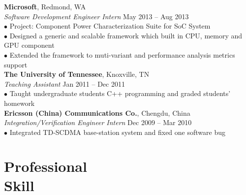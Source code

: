 \documentclass[margin, centered]{resume}
\begin{document}
\begin{resume}
    \textbf{Microsoft}, Redmond, WA \\\vspace{0mm}
    \emph{Software Development Engineer Intern} \hfill May 2013 -- Aug 2013 \vspace{0mm}\\
    $\bullet$ Project: Component Power Characterization Suite for SoC System\vspace{0mm}\\
    $\bullet$ Designed a generic and scalable framework which built in CPU, memory and GPU component \vspace{0mm}\\
    $\bullet$ Extended the framework to muti-variant and performance analysis metrics support \vspace{-6mm}\\

    \textbf{The University of Tennessee}, Knoxville, TN \\\vspace{0mm}%
    \emph{Teaching Assistant} \hfill Jan 2011 -- Dec 2011\vspace{0mm}\\
    $\bullet$ Taught undergraduate students C++ programming and graded students' homework\vspace{-6mm}\\
	
    \textbf{Ericsson (China) Communications Co.}, Chengdu, China \vspace{0mm}\\%
	\emph{Integration/Verification Engineer Intern} \hfill Dec 2009 -- Mar 2010\vspace{0mm}\\
    $\bullet$ Integrated TD-SCDMA base-station system and fixed one software bug\vspace{-5mm}\\

    \section{\mysidestyle Professional \\Skill} 
	

\end{resume}
\end{document}
